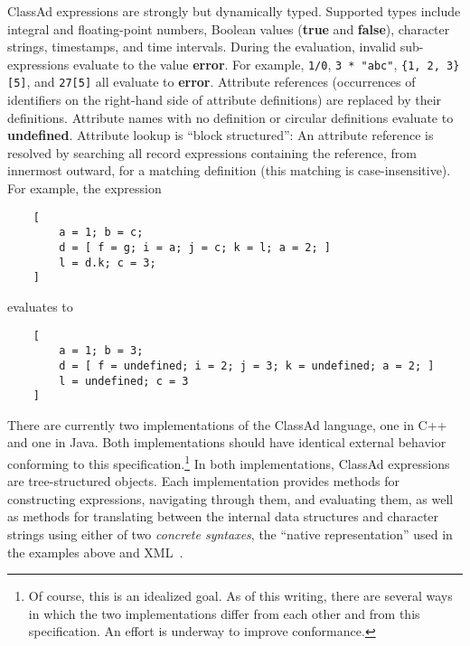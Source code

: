 \documentclass{article}
\begin{document}
ClassAd expressions are strongly but dynamically typed.   Supported types
include integral and floating-point numbers, Boolean values (\textbf{true} and
\textbf{false}), character strings, timestamps, and time intervals.  During the
evaluation, invalid sub-expressions evaluate to the value \textbf{error}.  For
example, \verb|1/0|, \verb|3 * "abc"|, \verb|{1, 2, 3}[5]|, and \verb|27[5]|
all evaluate to \textbf{error}.  Attribute references (occurrences of
identifiers on the right-hand side of attribute definitions) are replaced by
their definitions.  Attribute names with no definition or circular definitions
evaluate to \textbf{undefined}.  Attribute lookup is ``block structured'':  An
attribute reference is resolved by searching all record expressions containing
the reference, from innermost outward, for a matching definition (this matching
is case-insensitive).  For example, the expression
\begin{verbatim}
    [
        a = 1; b = c;
        d = [ f = g; i = a; j = c; k = l; a = 2; ]
        l = d.k; c = 3;
    ]
\end{verbatim}
evaluates to
\begin{verbatim}
    [
        a = 1; b = 3;
        d = [ f = undefined; i = 2; j = 3; k = undefined; a = 2; ]
        l = undefined; c = 3
    ]
\end{verbatim}

There are currently two implementations of the ClassAd language, one in C++ and
one in Java.  Both implementations should have identical external behavior
conforming to this specification.\footnote{Of course, this is an idealized
goal.  As of this writing, there are several ways in which the
two implementations differ from each other and from this specification.  An
effort is underway to improve conformance.}  In both implementations, ClassAd
expressions are tree-structured objects.  Each implementation provides methods
for constructing expressions, navigating through them, and evaluating them, as
well as methods for translating between the internal data structures and
character strings using either of two \emph{concrete syntaxes}, the ``native
representation'' used in the examples above and XML~\cite{XML}.
\end{document}
